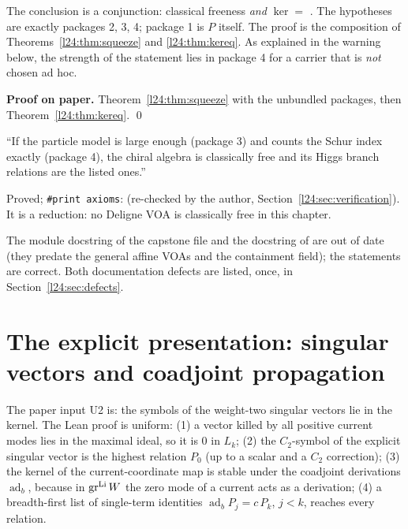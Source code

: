 \begin{dictionary}
The conclusion is a conjunction: classical freeness \emph{and} $\ker=$ . The hypotheses are
exactly packages 2, 3, 4; package 1 is $P$ itself. The proof is the composition of
Theorems~\ref{l24:thm:squeeze} and \ref{l24:thm:kereq}. As explained in the warning below, the strength of the
statement lies in package 4 for a carrier that is \emph{not} chosen ad hoc.
\end{dictionary}

\textbf{Proof on paper.} Theorem~\ref{l24:thm:squeeze} with the unbundled packages, then
Theorem~\ref{l24:thm:kereq}. \qed

\begin{physics}
``If the particle model is large enough (package 3) and counts the Schur index exactly (package 4), the
chiral algebra is classically free and its Higgs branch relations are the listed ones.''
\end{physics}

\begin{status}
Proved; \texttt{\#print axioms}:  (re-checked by the author,
Section~\ref{l24:sec:verification}). It is a reduction: no Deligne VOA is classically free in this chapter.
\end{status}

The module docstring of the capstone file and the docstring of  are out of
date (they predate the general affine VOAs and the containment field); the statements are correct. Both documentation
defects are listed, once, in Section~\ref{l24:sec:defects}.

\section[The explicit presentation]{The explicit presentation: singular vectors and coadjoint propagation}\label{l24:sec:presentation}

The paper input U2 is: the symbols of the weight-two singular vectors lie in the kernel. The Lean proof is
uniform: (1) a vector killed by all positive current modes lies in the maximal ideal, so it is $0$ in
$L_k$; (2) the $C_2$-symbol of the explicit singular vector is the highest relation $P_0$ (up to a
scalar and a $C_2$ correction); (3) the kernel of the current-coordinate map is stable under the coadjoint
derivations $\operatorname{ad}_b$, because in $\operatorname{gr}^{\mathrm{Li}} W$ the zero mode of a current acts as a
derivation; (4) a breadth-first list of single-term identities $\operatorname{ad}_bP_j=c\,P_k$, $j<k$,
reaches every relation.

